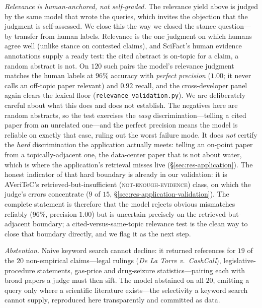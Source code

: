 \emph{Relevance is human-anchored, not self-graded.} The relevance yield above is judged by the same model
that wrote the queries, which invites the objection that the judgment is self-assessed. We close this the
way we closed the stance question---by transfer from human labels. Relevance is the one judgment on which
humans agree well (unlike stance on contested claims), and SciFact's human evidence annotations supply a
ready test: the cited abstract is on-topic for a claim, a random abstract is not. On $120$ such pairs the
model's relevance judgment matches the human labels at $96\%$ accuracy with \emph{perfect precision}
($1.00$; it never calls an off-topic paper relevant) and $0.92$ recall, and the cross-developer panel again
clears the lexical floor (\texttt{relevance\_validation.py}). We are deliberately careful about what this
does and does not establish. The negatives here are random abstracts, so the test exercises the
\emph{easy} discrimination---telling a cited paper from an unrelated one---and the perfect precision means
the model is reliable on exactly that case, ruling out the worst failure mode. It does \emph{not} certify
the \emph{hard} discrimination the application actually meets: telling an on-point paper from a
topically-adjacent one, the data-center paper that is not about water, which is where the application's
retrieval misses live (\S\ref{sec:res-application}). The honest indicator of that hard boundary is already in
our validation: it is AVeriTeC's retrieved-but-insufficient (\textsc{not-enough-evidence}) class, on which
the judge's errors concentrate ($9$ of $15$, \S\ref{sec:res-application-validation}). The complete
statement is therefore that the model rejects obvious mismatches reliably ($96\%$, precision $1.00$) but is
uncertain precisely on the retrieved-but-adjacent boundary; a cited-versus-same-topic relevance test is the
clean way to close that boundary directly, and we flag it as the next step.

\emph{Abstention.} Naive keyword search cannot decline: it returned references for $19$ of the $20$
non-empirical claims---legal rulings (\emph{De La Torre v.\ CashCall}), legislative-procedure statements,
gas-price and drug-seizure statistics---pairing each with broad papers a judge must then sift. The model
abstained on all $20$, emitting a query only where a scientific literature exists---the selectivity a
keyword search cannot supply, reproduced here transparently and committed as data.

